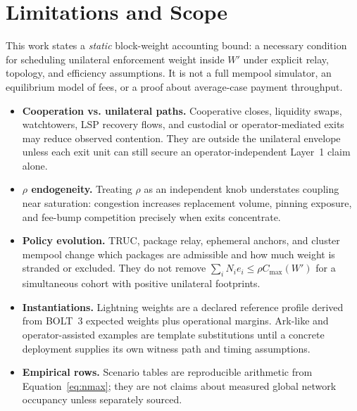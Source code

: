 \documentclass{article}
\theoremstyle{definition}
\begin{document}
\section{Limitations and Scope}
This work states a \emph{static} block-weight accounting bound: a necessary condition for scheduling unilateral enforcement weight inside $W'$ under explicit relay, topology, and efficiency assumptions. It is not a full mempool simulator, an equilibrium model of fees, or a proof about average-case payment throughput.
\begin{itemize}
    \itemsep0em
    \item \textbf{Cooperation vs. unilateral paths.} Cooperative closes, liquidity swaps, watchtowers, LSP recovery flows, and custodial or operator-mediated exits may reduce observed contention. They are outside the unilateral envelope unless each exit unit can still secure an operator-independent Layer~1 claim alone.
    \item \textbf{$\rho$ endogeneity.} Treating $\rho$ as an independent knob understates coupling near saturation: congestion increases replacement volume, pinning exposure, and fee-bump competition precisely when exits concentrate.
    \item \textbf{Policy evolution.} TRUC, package relay, ephemeral anchors, and cluster mempool change which packages are admissible and how much weight is stranded or excluded. They do not remove $\sum_i N_i e_i \le \rho C_{\max}(W')$ for a simultaneous cohort with positive unilateral footprints.
    \item \textbf{Instantiations.} Lightning weights are a declared reference profile derived from BOLT~3 expected weights plus operational margins. Ark-like and operator-assisted examples are template substitutions until a concrete deployment supplies its own witness path and timing assumptions.
    \item \textbf{Empirical rows.} Scenario tables are reproducible arithmetic from Equation~\eqref{eq:nmax}; they are not claims about measured global network occupancy unless separately sourced.
\end{itemize}
\end{document}
